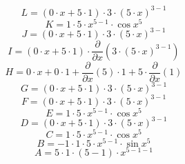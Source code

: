 \documentclass[12pt]{article}
\begin{document}
\begin{equation}
	L = 
\left( 0\cdot x + 5\cdot 1\right) \cdot 3\cdot \left( 5\cdot x\right) ^{3 - 1}
\end{equation}
\begin{equation}
	K = 
1\cdot 5\cdot x^{5 - 1}\cdot \cos {x^{5}}
\end{equation}
\begin{equation}
	J = 
\left( 0\cdot x + 5\cdot 1\right) \cdot 3\cdot \left( 5\cdot x\right) ^{3 - 1}
\end{equation}
\begin{equation}
	I = 
\left( 0\cdot x + 5\cdot 1\right) \cdot \frac{\partial}{\partial x}\left( 3\cdot \left( 5\cdot x\right) ^{3 - 1}\right) 
\end{equation}
\begin{equation}
	H = 
0\cdot x + 0\cdot 1 + \frac{\partial}{\partial x}\left( 5\right) \cdot 1 + 5\cdot \frac{\partial}{\partial x}\left( 1\right) 
\end{equation}
\begin{equation}
	G = 
\left( 0\cdot x + 5\cdot 1\right) \cdot 3\cdot \left( 5\cdot x\right) ^{3 - 1}
\end{equation}
\begin{equation}
	F = 
\left( 0\cdot x + 5\cdot 1\right) \cdot 3\cdot \left( 5\cdot x\right) ^{3 - 1}
\end{equation}
\begin{equation}
	E = 
1\cdot 5\cdot x^{5 - 1}\cdot \cos {x^{5}}
\end{equation}
\begin{equation}
	D = 
\left( 0\cdot x + 5\cdot 1\right) \cdot 3\cdot \left( 5\cdot x\right) ^{3 - 1}
\end{equation}
\begin{equation}
	C = 
1\cdot 5\cdot x^{5 - 1}\cdot \cos {x^{5}}
\end{equation}
\begin{equation}
	B = 
-1\cdot 1\cdot 5\cdot x^{5 - 1}\cdot \sin {x^{5}}
\end{equation}
\begin{equation}
	A = 
5\cdot 1\cdot \left( 5 - 1\right) \cdot x^{5 - 1 - 1}
\end{equation}
\end{document}

